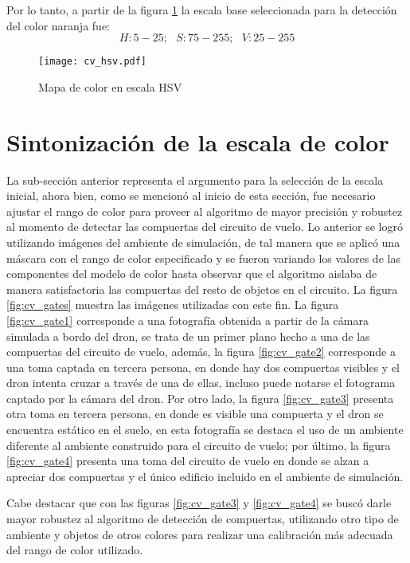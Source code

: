 Por lo tanto, a partir de la figura \ref{fig:cv_hsv} la escala base seleccionada para la detección del color naranja fue: \[H:5-25;\text{ } S:75-255;\text{ } V:25-255\]

\begin{figure}[ht]
    \centering
    \texttt{[image: cv\_hsv.pdf]}
    \caption{Mapa de color en escala HSV \cite{dey_2020}}
    \label{fig:cv_hsv}
\end{figure}

\section{Sintonización de la escala de color}

La sub-sección anterior representa el argumento para la selección de la escala inicial, ahora bien, como se mencionó al inicio de esta sección, fue necesario ajustar el rango de color para proveer al algoritmo de mayor precisión y robustez al momento de detectar las compuertas del circuito de vuelo. Lo anterior se logró utilizando imágenes del ambiente de simulación, de tal manera que se aplicó una máscara con el rango de color especificado y se fueron variando los valores de las componentes del modelo de color hasta observar que el algoritmo aislaba de manera satisfactoria las compuertas del resto de objetos en el circuito. La figura \ref{fig:cv_gates} muestra las imágenes utilizadas con este fin. La figura \ref{fig:cv_gate1} corresponde a una fotografía obtenida a partir de la cámara simulada a bordo del dron, se trata de un primer plano hecho a una de las compuertas del circuito de vuelo, además, la figura \ref{fig:cv_gate2} corresponde a una toma captada en tercera persona, en donde hay dos compuertas visibles y el dron intenta cruzar a través de una de ellas, incluso puede notarse el fotograma captado por la cámara del dron. Por otro lado, la figura \ref{fig:cv_gate3} presenta otra toma en tercera persona, en donde es visible una compuerta y el dron se encuentra estático en el suelo, en esta fotografía se destaca el uso de un ambiente diferente al ambiente construido para el circuito de vuelo; por último, la figura \ref{fig:cv_gate4} presenta una toma del circuito de vuelo en donde se alzan a apreciar dos compuertas y el único edificio incluido en el ambiente de simulación. 

Cabe destacar que  con las figuras \ref{fig:cv_gate3} y \ref{fig:cv_gate4} se buscó darle mayor robustez al algoritmo de detección de compuertas, utilizando otro tipo de ambiente y objetos de otros colores para realizar una calibración más adecuada del rango de color utilizado.

